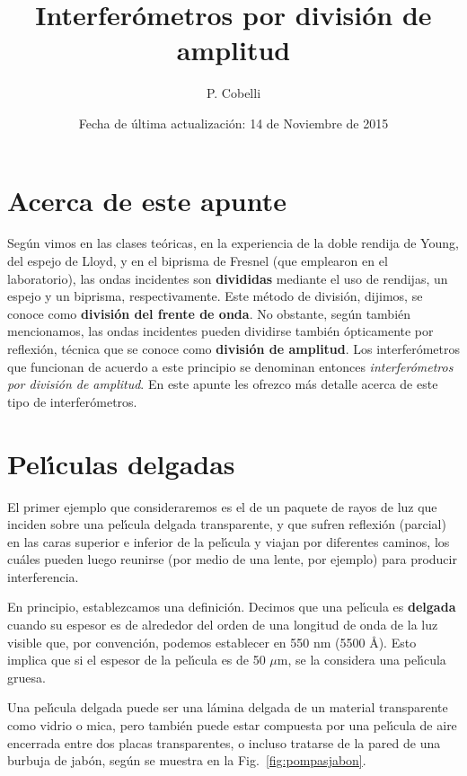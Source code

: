 \documentclass[a4paper]{article}
\newcommand{\angstrom}{\textup{\AA}}
\begin{document}
\title{Interfer\'ometros por divisi\'on de amplitud}
\author{P. Cobelli}
\date{Fecha de \'ultima actualizaci\'on: 14 de Noviembre de 2015}
\maketitle

\tableofcontents

\section{Acerca de este apunte}

Seg\'un vimos en las clases te\'oricas, en la experiencia de la doble rendija
de Young, del espejo de Lloyd, y en el biprisma de Fresnel (que emplearon en
el laboratorio), las ondas incidentes son {\bf divididas} mediante el uso de
rendijas, un espejo y un biprisma, respectivamente. Este m\'etodo de
divisi\'on, dijimos, se conoce como {\bf divisi\'on del frente de onda}. 
No obstante, seg\'un tambi\'en mencionamos, las ondas incidentes pueden 
dividirse tambi\'en \'opticamente por reflexi\'on, t\'ecnica que se conoce
como {\bf divisi\'on de amplitud}. Los interfer\'ometros que funcionan de 
acuerdo a este principio se denominan entonces {\it interfer\'ometros por
divisi\'on de amplitud}. En este apunte les ofrezco m\'as detalle acerca de 
este tipo de interfer\'ometros.

\section{Pel\'\i culas delgadas}

El primer ejemplo que consideraremos es el de un paquete de rayos de luz que
inciden sobre una pel\'\i cula delgada transparente, y que sufren reflexi\'on
(parcial) en las caras superior e inferior de la pel\'\i cula y viajan por
diferentes caminos, los cu\'ales pueden luego reunirse (por medio de una 
lente, por ejemplo) para producir interferencia. 

En principio, establezcamos una definici\'on. Decimos que una pel\'\i cula 
es {\bf delgada} cuando su espesor es de alrededor del orden de una 
longitud de onda de la luz visible que, por convenci\'on, podemos establecer
en 550 nm (5500 \angstrom). Esto implica que si el espesor de la pel\'\i cula
es de 50 $\mu$m, se la considera una pel\'\i cula gruesa. 

Una pel\'\i cula delgada puede ser una l\'amina delgada de un material 
transparente como vidrio o mica, pero tambi\'en puede estar compuesta por una
pel\'\i cula de aire encerrada entre dos placas transparentes, o incluso 
tratarse de la pared de una burbuja de jab\'on, seg\'un se muestra en la 
Fig.~\ref{fig:pompasjabon}.
\end{document}
